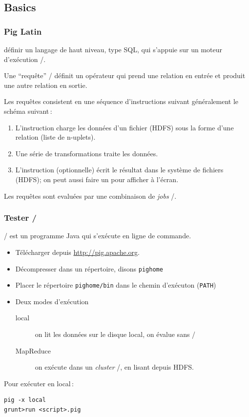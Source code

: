 \subsection{Basics}
\begin{frame}
\frametitle{Pig Latin}

 définir un langage de haut niveau, type SQL,
qui s'appuie sur un moteur d'exécution \mapreduce/.

\vfill

Une ``requête'' \pig/ définit un opérateur qui prend une \alert{relation} en entrée
et produit une autre relation en sortie.

\vfill

Les requêtes consistent en une \alert{séquence} d'instructions 
suivant généralement le schéma suivant\,:

\begin{enumerate}
 \item  L'instruction  charge les données d'un fichier (HDFS)
       sous la forme d'une \alert{relation} (liste de n-uplets).
   \item Une série de transformations traite les données.
   \item L'instruction (optionnelle)  écrit le résultat dans le système
       de fichiers (HDFS); on peut aussi faire un 
         pour afficher à l'écran.
\end{enumerate}

\vfill

Les requêtes sont evaluées par une \alert{combinaison} de \textit{jobs} \mapreduce/.
\end{frame}

\begin{frame}[fragile]
\frametitle{Tester \pig/}

\pig/ est un programme Java qui s'exécute en ligne de commande.
\begin{itemize}

\item Télécharger  depuis \url{http://pig.apache.org}.

\item Décompresser dans un répertoire, disons \texttt{pighome}

\item Placer le répertoire \texttt{pighome/bin} dans le chemin d'exécuton (\texttt{PATH})
\item Deux modes d'exécution
\begin{description}
\item[local] on lit les données sur le disque local, on évalue sans \mapreduce/ 
\item[MapReduce] on exécute dans un \textit{cluster} \mapreduce/, en lisant depuis HDFS.
\end{description}



\end{itemize}

Pour exécuter en local\,:
\begin{verbatim}
pig -x local
grunt>run <script>.pig
\end{verbatim}

\end{frame}

